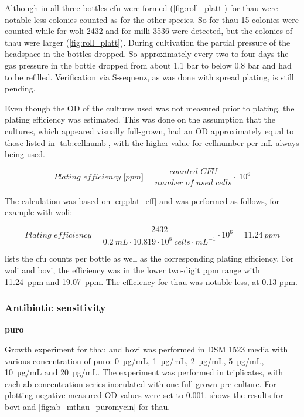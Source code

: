 Although in all three bottles \acrfull{cfu} were formed (\cref{fig:roll_platt}) for \acrshort{thau} were notable less colonies counted as for the other species. So for \acrshort{thau} 15 colonies were counted while for \acrshort{woli} 2432 and for \acrshort{milli} 3536 were detected, but the colonies of \acrshort{thau} were larger (\cref{fig:roll_platt}).
During cultivation the partial pressure of the headspace in the bottles dropped. So approximately every two to four days the gas pressure in the bottle dropped from about 1.1 bar to below 0.8 bar and had to be refilled. Verification via \gls{S-sequenz}, as was done with spread plating, is still pending. 

Even though the \acrshort{OD} of the cultures used was not measured prior to plating, the plating efficiency was estimated. This was done on the assumption that the cultures, which appeared visually full-grown, had an \acrshort{OD} approximately equal to those listed in \cref{tab:cellnumb}, with the higher value for cellnumber per mL always being used. 

\begin{equation}
	\textit{Plating efficiency [ppm]} = \frac{\textit{counted CFU}}{\textit{number of used cells}} \cdot\ 10^6
	\label{eq:plat_eff}
\end{equation}

The calculation was based on \cref{eq:plat_eff} and was performed as follows, for example with \acrshort{woli}:

\begin{equation*}
	\textit{Plating efficiency} = \frac{2432}{0.2\ mL \cdot 10.819 \cdot 10^8\ cells \cdot mL^{-1}} \cdot 10^6 = 11.24\ ppm	
\end{equation*}




 lists the \acrshort{cfu} counts per bottle as well as the corresponding plating efficiency. For \acrshort{woli} and \acrshort{bovi}, the efficiency was in the lower two-digit ppm range with 11.24~ppm and 19.07~ppm. The efficiency for \acrshort{thau} was notable less, at  0.13 ppm.

\subsubsection{Antibiotic sensitivity}
\label{sec:AB_sens_result}


\textbf{\Acrlong{puro}}

\noindent Growth experiment for \acrshort{thau} and \acrshort{bovi} was performed in DSM 1523 media with various concentration of \acrshort{puro}: 0~µg/mL, 1~µg/mL, 2~µg/mL, 5~µg/mL, 10~µg/mL and 20~µg/mL. The experiment was performed in triplicates, with each \acrfull{ab} concentration series inoculated with one full-grown pre-culture. For plotting negative measured \acrshort{OD} values were set to 0.001.  shows the results for \acrshort{bovi} and \cref{fig:ab_mthau_puromycin} for \acrshort{thau}.

